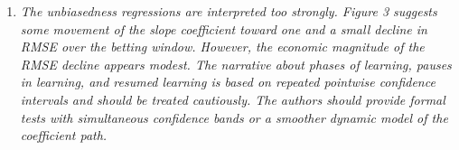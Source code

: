 \documentclass[letterpaper,12pt]{article}
\newcounter{b}
\newcommand{\Reply}[1]{\par\noindent\textbf{Reply:} #1}
\begin{document}
\begin{enumerate}

\item \textit{The unbiasedness regressions are interpreted too strongly. Figure 3 suggests some
movement of the slope coefficient toward one and a small decline in RMSE over the
betting window. However, the economic magnitude of the RMSE decline appears
modest. The narrative about phases of learning, pauses in learning, and resumed
learning is based on repeated pointwise confidence intervals and should be treated
cautiously. The authors should provide formal tests with simultaneous confidence
bands or a smoother dynamic model of the coefficient path. }


\end{enumerate}
\end{document}

